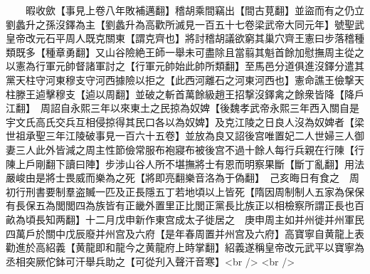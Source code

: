 　　暇收歛【事見上卷八年敗補邁翻】稽胡乘間竊出【間古莧翻】並盜而有之仍立劉蠡升之孫沒鐸為主【劉蠡升為高歡所滅見一百五十七卷梁武帝大同元年】號聖武皇帝改元石平周人既克關東【謂克齊也】將討稽胡議欲窮其巢穴齊王憲曰步落稽種類既多【種章勇翻】又山谷險絶王師一舉未可盡除且當翦其魁首餘加慰撫周主從之以憲為行軍元帥督諸軍討之【行軍元帥始此帥所類翻】至馬邑分道俱進沒鐸分遣其黨天柱守河東穆支守河西據險以拒之【此西河離石之河東河西也】憲命譙王儉撃天柱滕王逌擊穆支【逌以周翻】並破之斬首萬餘級趙王招撃沒鐸禽之餘衆皆降【降戶江翻】　周詔自永熙三年以來東土之民掠為奴婢【後魏孝武帝永熙三年西入關自是宇文氏高氏交兵互相侵掠得其民口各以為奴婢】及克江陵之日良人沒為奴婢者【梁世祖承聖三年江陵破事見一百六十五卷】並放為良又詔後宫唯置妃二人世婦三人御妻三人此外皆減之周主性節儉常服布袍寢布被後宫不過十餘人每行兵親在行陳【行陳上戶剛翻下讀曰陣】步涉山谷人所不堪撫將士有恩而明察果斷【斷丁亂翻】用法嚴峻由是將士畏威而樂為之死【將即亮翻樂音洛為于偽翻】　己亥晦日有食之　周初行刑書要制羣盗贓一匹及正長隱五丁若地頃以上皆死【隋因周制制人五家為保保有長保五為閭閭四為族皆有正畿外置里正比閭正黨長比族正以相檢察所謂正長也百畝為頃長知两翻】十二月戊申新作東宫成太子徙居之　庚申周主如并州徙并州軍民四萬戶於關中戊辰廢并州宫及六府【是年春周置并州宫及六府】高寶寧自黄龍上表勸進於高紹義【黄龍即和龍今之黄龍府上時掌翻】紹義遂稱皇帝改元武平以寶寧為丞相突厥佗鉢可汗舉兵助之【可從刋入聲汗音寒】<br />
<br />
